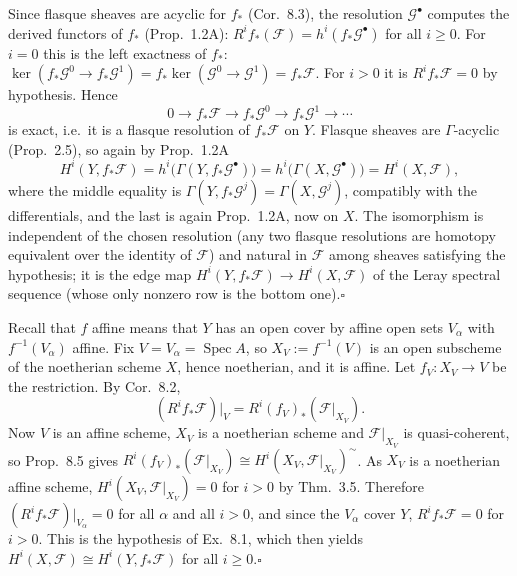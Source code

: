 \documentclass[11pt]{article}
\begin{document}
Since flasque sheaves are acyclic for $f_*$ (Cor.~8.3), the resolution $\mathcal G^\bullet$ computes the derived functors of $f_*$ (Prop.~1.2A): $R^if_*(\mathcal F)=h^i(f_*\mathcal G^\bullet)$ for all $i\ge0$. For $i=0$ this is the left exactness of $f_*$: $\ker(f_*\mathcal G^0\to f_*\mathcal G^1)=f_*\ker(\mathcal G^0\to\mathcal G^1)=f_*\mathcal F$. For $i>0$ it is $R^if_*\mathcal F=0$ by hypothesis. Hence
\[
0\to f_*\mathcal F\to f_*\mathcal G^0\to f_*\mathcal G^1\to\cdots
\]
is exact, i.e.\ it is a flasque resolution of $f_*\mathcal F$ on $Y$. Flasque sheaves are $\Gamma$-acyclic (Prop.~2.5), so again by Prop.~1.2A
\[
H^i(Y,f_*\mathcal F)=h^i\bigl(\Gamma(Y,f_*\mathcal G^\bullet)\bigr)=h^i\bigl(\Gamma(X,\mathcal G^\bullet)\bigr)=H^i(X,\mathcal F),
\]
where the middle equality is $\Gamma(Y,f_*\mathcal G^j)=\Gamma(X,\mathcal G^j)$, compatibly with the differentials, and the last is again Prop.~1.2A, now on $X$. The isomorphism is independent of the chosen resolution (any two flasque resolutions are homotopy equivalent over the identity of $\mathcal F$) and natural in $\mathcal F$ among sheaves satisfying the hypothesis; it is the edge map $H^i(Y,f_*\mathcal F)\to H^i(X,\mathcal F)$ of the Leray spectral sequence (whose only nonzero row is the bottom one).\hfill$\square$

\pf
Recall that $f$ affine means that $Y$ has an open cover by affine open sets $V_\alpha$ with $f^{-1}(V_\alpha)$ affine. Fix $V=V_\alpha=\operatorname{Spec}A$, so $X_V:=f^{-1}(V)$ is an open subscheme of the noetherian scheme $X$, hence noetherian, and it is affine. Let $f_V:X_V\to V$ be the restriction. By Cor.~8.2,
\[
(R^if_*\mathcal F)|_V=R^i(f_V)_*(\mathcal F|_{X_V}).
\]
Now $V$ is an affine scheme, $X_V$ is a noetherian scheme and $\mathcal F|_{X_V}$ is quasi-coherent, so Prop.~8.5 gives $R^i(f_V)_*(\mathcal F|_{X_V})\cong H^i(X_V,\mathcal F|_{X_V})^{\sim}$. As $X_V$ is a noetherian affine scheme, $H^i(X_V,\mathcal F|_{X_V})=0$ for $i>0$ by Thm.~3.5. Therefore $(R^if_*\mathcal F)|_{V_\alpha}=0$ for all $\alpha$ and all $i>0$, and since the $V_\alpha$ cover $Y$, $R^if_*\mathcal F=0$ for $i>0$. This is the hypothesis of Ex.~8.1, which then yields $H^i(X,\mathcal F)\cong H^i(Y,f_*\mathcal F)$ for all $i\ge0$.\hfill$\square$
\end{document}
